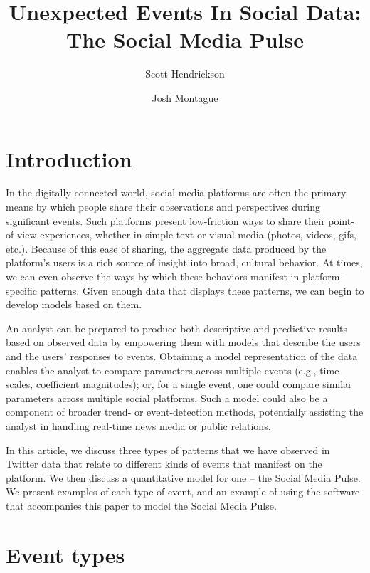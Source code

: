 \documentclass{article}
\title{Unexpected Events In Social Data: The Social Media Pulse}
\author[]{Scott Hendrickson}
\author[]{Josh Montague}
\affil[]{Twitter, Inc.}
\begin{document}
 

\section{Introduction}
\label{sec:intro}

In the digitally connected world, social media platforms are often the primary means by which people share their observations and perspectives during significant events. Such platforms present low-friction ways to share their point-of-view experiences, whether in simple text or visual media (photos, videos, gifs, etc.). Because of this ease of sharing, the aggregate data produced by the platform's users is a rich source of insight into broad, cultural behavior. At times, we can even observe the ways by which these behaviors manifest in platform-specific patterns. Given enough data that displays these patterns, we can begin to develop models based on them.   

An analyst can be prepared to produce both descriptive and predictive results based on observed data by empowering them with models that describe the users and the users' responses to events. Obtaining a model representation of the data enables the analyst to compare parameters across multiple events (e.g., time scales, coefficient magnitudes); or, for a single event, one could compare similar parameters across multiple social platforms. Such a model could also be a component of broader trend- or event-detection methods, potentially assisting the analyst in handling real-time news media or public relations. 

In this article, we discuss three types of patterns that we have observed in Twitter data that relate to different kinds of events that manifest on the platform. We then discuss a quantitative model for one -- the Social Media Pulse. We present examples of each type of event, and an example of using the software that accompanies this paper to model the Social Media Pulse.\cite{pulse}


\section{Event types}
\label{sec:models}
\end{document}
